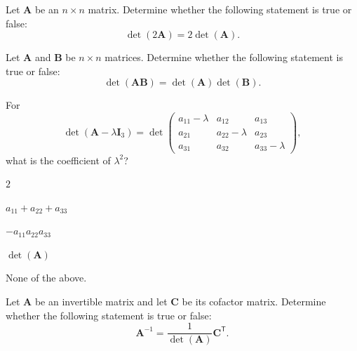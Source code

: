\begin{problem}
Let $\mathbf A$ be an $n\times n$ matrix. Determine whether the following statement is true or false:
\[
\det(2\mathbf A)=2\det(\mathbf A).
\]
\end{problem}

\begin{problem}
Let $\mathbf A$ and $\mathbf B$ be $n\times n$ matrices. Determine whether the following statement is true or false:
\[
\det(\mathbf A\mathbf B)=\det(\mathbf A)\det(\mathbf B).
\]
\end{problem}

\begin{problem}
For
\[
\det(\mathbf A-\lambda\mathbf I_3)
=
\det
\begin{pmatrix}
a_{11}-\lambda&a_{12}&a_{13}\\
a_{21}&a_{22}-\lambda&a_{23}\\
a_{31}&a_{32}&a_{33}-\lambda
\end{pmatrix},
\]
what is the coefficient of $\lambda^2$?
\begin{problemchoices}
\item $2$
\item $a_{11}+a_{22}+a_{33}$
\item $-a_{11}a_{22}a_{33}$
\item $\det(\mathbf A)$
\item None of the above.
\end{problemchoices}
\end{problem}

\begin{problem}
Let $\mathbf A$ be an invertible matrix and let $\mathbf C$ be its cofactor matrix. Determine whether the following statement is true or false:
\[
\mathbf A^{-1}=\frac{1}{\det(\mathbf A)}\mathbf C^{\mathsf T}.
\]
\end{problem}


